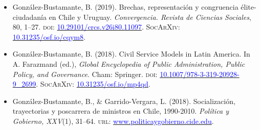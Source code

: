 \begin{publications}
\begin{itemize}

\item{González-Bustamante, B. (2019). Brechas, representación y congruencia élite-ciudadanía en Chile y Uruguay. {\itshape Convergencia. Revista de Ciencias Sociales}, 80, 1--27. {\scshape doi}: \href{https://doi.org/10.29101/crcs.v26i80.11097}{\textcolor{blue}{10.29101/crcs.v26i80.11097}}. {\scshape \footnotesize SocArXiv:} \\ \href{https://doi.org/10.31235/osf.io/cqym8}{\textcolor{blue}{10.31235/osf.io/cqym8}}.}\vspace{1mm} %

\item{González-Bustamante, B. (2018). Civil Service Models in Latin America. In A. Farazmand (ed.), {\itshape Global Encyclopedia of Public Administration, Public Policy, and Governance}. Cham: Springer. {\scshape doi:} \href{https://doi.org/10.1007/978-3-319-20928-9\_2699}{\textcolor{blue}{10.1007/978-3-319-20928-9\_2699}}. {\scshape \footnotesize SocArXiv:} \href{https://doi.org/10.31235/osf.io/mp4qd}{\textcolor{blue}{10.31235/osf.io/mp4qd}}.}\vspace{1mm}


\item{González-Bustamante, B., \& Garrido-Vergara, L. (2018). Socialización, trayectorias y poscarrera de ministros en Chile, 1990-2010. {\itshape Política y Gobierno, XXV}(1), 31--64. {\scshape url:} \href{http://www.politicaygobierno.cide.edu/index.php/pyg/article/view/1080}{\textcolor{blue}{www.politicaygobierno.cide.edu}}.}\vspace{1mm}

\end{itemize}

\end{publications}
